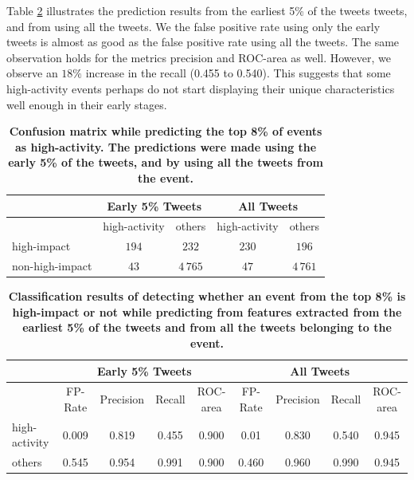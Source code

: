 Table \ref{tab:classification_results} illustrates the prediction results
from the earliest 5\% of the tweets tweets, and from using all the tweets.
We the false positive rate using only the early tweets is almost
as good as the false positive rate using all the tweets.
The same observation holds for the metrics precision and ROC-area as well.
However, we observe an $18\%$ increase in the recall (0.455 to 0.540).
This suggests that some high-activity events
perhaps do not start displaying their unique characteristics
well enough in their early stages. 
\begin{table}
  \centering
  \begin{tabular}{lcc|cc}
    \toprule
    \multirow{2}{*}{ }& \multicolumn{2}{c}{Early 5\% Tweets} & \multicolumn{2}{c}{All Tweets} \\
    \midrule
    & high-activity & others & high-activity & others \\
    high-impact & $194$ & $232$ & $230$ & $196$\\
    non-high-impact & $43$ & $4\,765$ & $47$ & $4\,761$ \\
    \bottomrule
  \end{tabular}
  \caption{\textbf{Confusion matrix while predicting the top 8\% of events
      as high-activity.  The predictions were made using the early 5\% of the tweets, and by using
      all the tweets from the event.}}
  \label{tab:confusion_matrix}
\end{table}
\begin{table}

  \centering
  {\small
    \begin{tabular}{lcccc|cccc}
      \toprule
      & \multicolumn{4}{c}{Early 5\% Tweets} & \multicolumn{4}{c}{All Tweets} \\
      \midrule
      & FP-Rate & Precision & Recall & ROC-area & FP-Rate & Precision & Recall & ROC-area \\
      high-activity & 0.009 & 0.819 & 0.455 & 0.900 & 0.01 & 0.830 & 0.540 & 0.945 \\
      others & 0.545 & 0.954 & 0.991 & 0.900 &  0.460 & 0.960 & 0.990 & 0.945 \\
      \bottomrule
    \end{tabular}
  }
  \caption{\textbf{Classification results of detecting whether an event from the top 8\% is high-impact or not
      while predicting from features extracted from the earliest 5\% of the tweets and from all the tweets belonging to the event.}}
  \label{tab:classification_results}
\end{table}

